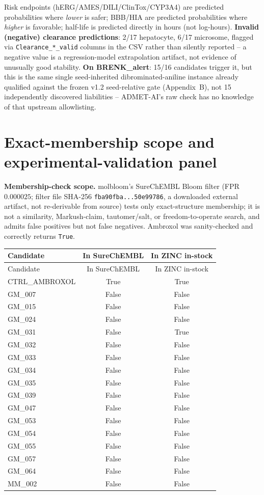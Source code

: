 \documentclass{article}
\begin{document}
Risk endpoints (hERG/AMES/DILI/ClinTox/CYP3A4) are predicted probabilities where \emph{lower} is safer; BBB/HIA are predicted probabilities where \emph{higher} is favorable; half-life is predicted directly in hours (not log-hours). \textbf{Invalid (negative) clearance predictions}: 2/17 hepatocyte, 6/17 microsome, flagged via \texttt{Clearance\_*\_valid} columns in the CSV rather than silently reported -- a negative value is a regression-model extrapolation artifact, not evidence of unusually good stability. \textbf{On BRENK\_alert}: 15/16 candidates trigger it, but this is the same single seed-inherited dibrominated-aniline instance already qualified against the frozen v1.2 seed-relative gate (Appendix~B), not 15 independently discovered liabilities -- ADMET-AI's raw check has no knowledge of that upstream allowlisting.

\FloatBarrier
\section{Exact-membership scope and experimental-validation panel}
\label{app:g}

\textbf{Membership-check scope.} molbloom's SureChEMBL Bloom filter (FPR $0.000025$; filter file SHA-256 \texttt{fba90fba...50e99786}, a downloaded external artifact, not re-derivable from source) tests only exact-structure membership; it is not a similarity, Markush-claim, tautomer/salt, or freedom-to-operate search, and admits false positives but not false negatives. Ambroxol was sanity-checked and correctly returns \texttt{True}.

\begin{longtable}{lcc}
\toprule
Candidate & In SureChEMBL & In ZINC in-stock \\
\midrule
\endfirsthead
\toprule
Candidate & In SureChEMBL & In ZINC in-stock \\
\midrule
\endhead
CTRL\_AMBROXOL & True & True \\
GM\_007 & False & False \\
GM\_015 & False & False \\
GM\_024 & False & False \\
GM\_031 & False & True \\
GM\_032 & False & False \\
GM\_033 & False & False \\
GM\_034 & False & False \\
GM\_035 & False & False \\
GM\_039 & False & False \\
GM\_047 & False & False \\
GM\_053 & False & False \\
GM\_054 & False & False \\
GM\_055 & False & False \\
GM\_057 & False & False \\
GM\_064 & False & False \\
MM\_002 & False & False \\
\bottomrule
\end{longtable}
\end{document}

